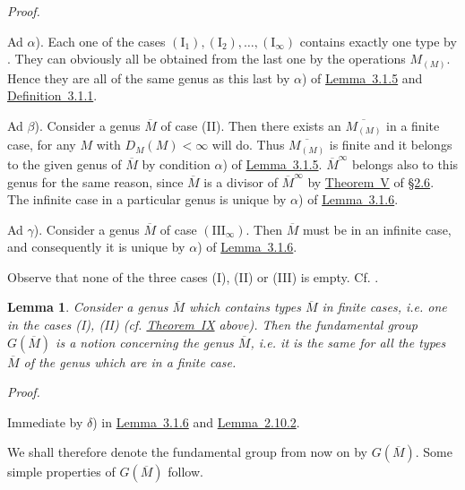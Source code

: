 \documentclass[b5paper,twoside]{article}
\newcommand{\secref}[2]{\hyperref[#1]{\mbox{\S#2}}}
\newcommand{\thmref}[2]{\hyperref[#1]{\mbox{Theorem~#2}}}
\newcommand{\lemref}[2]{\hyperref[#1]{\mbox{Lemma~#2}}}
\newcommand{\defref}[2]{\hyperref[#1]{\mbox{Definition~#2}}}
\theoremstyle{mvnplain}
\newtheorem{lemma}{Lemma}[section]
\renewenvironment{proof}[1][Proof]{%
  \par\addvspace{0.35\baselineskip}%
  \noindent\textit{#1.}\ \normalfont\ignorespaces
}{%
  \par\addvspace{0.35\baselineskip}%
}
\newcommand{\M}{\mathbf M}
\def\M{M}%
\def\widetilde#1{#1}%
\def\mathfrak#1{#1}%
\begin{document}
\begin{proof}
Ad \(\alpha\)). Each one of the cases
\((\mathrm I_1),(\mathrm I_2),\ldots,(\mathrm I_\infty)\) contains exactly
one type by \cite[p.~173, Lemma~8.6.1]{ref5}. They can obviously all be
obtained from the last one by the operations \(\M_{(\mathfrak M)}\). Hence
they are all of the same genus as this last by \(\alpha\)) of
\lemref{lem:3.1.5}{3.1.5} and \defref{def:3.1.1}{3.1.1}.

Ad \(\beta\)). Consider a genus \(\widetilde{\overline{\M}}\) of case (II).
Then there exists an \(\overline{\M_{(\mathfrak M)}}\) in a finite case, for
any \(\mathfrak M\) with \(D_{\M}(\mathfrak M)<\infty\) will do. Thus
\(\overline{\M_{(\mathfrak M)}}\) is finite and it belongs to the given genus
of \(\overline{\M}\) by condition \(\alpha\)) of
\lemref{lem:3.1.5}{3.1.5}. \(\overline{\M}^{\infty}\) belongs also to this
genus for the same reason, since \(\overline{\M}\) is a divisor of
\(\overline{\M}^{\infty}\) by \thmref{thm:V}{V} of
\secref{sec:2.6}{2.6}. The infinite case in a particular genus is unique by
\(\alpha\)) of \lemref{lem:3.1.6}{3.1.6}.

Ad \(\gamma\)). Consider a genus \(\widetilde{\overline{\M}}\) of case
\((\mathrm {III}_\infty)\). Then \(\overline{\M}\) must be in an infinite
case, and consequently it is unique by \(\alpha\)) of
\lemref{lem:3.1.6}{3.1.6}.

Observe that none of the three cases (I), (II) or (III) is empty. Cf.
\cite[p.~94, \S1, in the introduction]{ref8}.
\end{proof}

\begin{lemma}\label{lem:3.2.1}
Consider a genus \(\widetilde{\overline{\M}}\) which contains types
\(\overline{\M}\) in finite cases, i.e. one in the cases (I), (II) (cf.
\thmref{thm:IX}{IX} above). Then the fundamental group
\(\mathfrak G(\overline{\M})\) is a notion concerning the genus
\(\widetilde{\overline{\M}}\), i.e. it is the same for all the types
\(\overline{\M}\) of the genus which are in a finite case.
\end{lemma}

\begin{proof}
Immediate by \(\delta\)) in \lemref{lem:3.1.6}{3.1.6} and
\lemref{lem:2.10.2}{2.10.2}.
\end{proof}

We shall therefore denote the fundamental group from now on by
\(\mathfrak G(\widetilde{\overline{\M}})\). Some simple properties of
\(\mathfrak G(\widetilde{\overline{\M}})\) follow.
\end{document}
